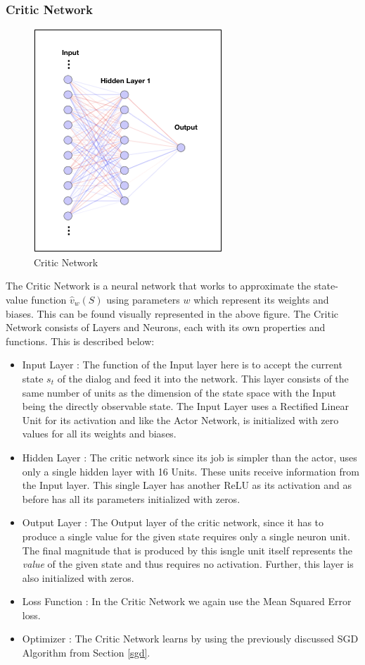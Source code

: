 \documentclass[14pt]{extarticle}
\numberwithin{equation}{section}
\begin{document}
	\subsubsection{Critic Network}
	\begin{figure}[h]
	\vspace{0.2cm}
	\centering
	\includegraphics[scale=0.6]{nn-critic}
	\caption{Critic Network
		\label{nn-critic}}
	\end{figure}
	The Critic Network is a neural network that works to approximate the state-value function $\hat{v}_w(S)$ using parameters $w$ which represent its weights and biases. This can be found visually represented in the above figure. The Critic Network consists of Layers and Neurons, each with its own properties and functions. This is described below:
	\begin{itemize}
		\item Input Layer : The function of the Input layer here is to accept the current state $s_t$ of the dialog and feed it into the network. This layer consists of the same number of units as the dimension of the state space with the Input being the directly observable state. The Input Layer uses a Rectified Linear Unit for its activation and like the Actor Network, is initialized with zero values for all its weights and biases.
		\item Hidden Layer : The critic network since its job is simpler than the actor, uses only a single hidden layer with 16 Units. These units receive information from the Input layer. This single Layer has another ReLU as its activation and as before has all its parameters initialized with zeros.
		\item Output Layer : The Output layer of the critic network, since it has to produce a single value for the given state requires only a single neuron unit. The final magnitude that is produced by this isngle unit itself represents the \textit{value} of the given state and thus requires no activation. Further, this layer is also initialized with zeros.
		\item Loss Function : In the Critic Network we again use the Mean Squared Error loss.
		\item Optimizer : The Critic Network learns by using the previously discussed SGD Algorithm from Section \ref{sgd}.
	\end{itemize}
\end{document}
